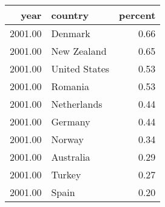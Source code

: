 \begin{table}[ht]
\centering
\begin{tabular}{rlr}
  \hline
year & country & percent \\ 
  \hline
2001.00 & Denmark & 0.66 \\ 
  2001.00 & New Zealand & 0.65 \\ 
  2001.00 & United States & 0.53 \\ 
  2001.00 & Romania & 0.53 \\ 
  2001.00 & Netherlands & 0.44 \\ 
  2001.00 & Germany & 0.44 \\ 
  2001.00 & Norway & 0.34 \\ 
  2001.00 & Australia & 0.29 \\ 
  2001.00 & Turkey & 0.27 \\ 
  2001.00 & Spain & 0.20 \\ 
   \hline
\end{tabular}
\end{table}
